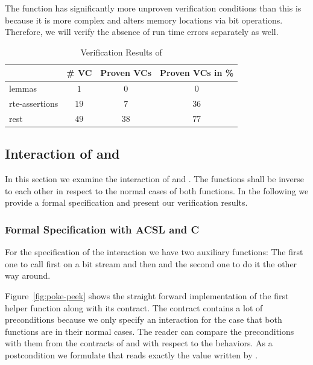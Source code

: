 The function \poke has significantly more unproven verification conditions than \peek
this is because it is more complex and alters memory locations via bit operations.
Therefore, we will verify the absence of run time errors separately as well.

\begin{table}
  \centering
  \begin{tabular}[h]{lccc}
    \toprule
     & \# VC & Proven VCs & Proven VCs in \%\\
    \midrule
    lemmas & $1$ &$0$ & $0$ \\
    rte-assertions&$19$&$7$&$36$\\
    rest &$49$ &$38$&$77$\\
    \bottomrule
  \end{tabular}
  \caption{Verification Results of \poke}
  \label{tab:results-poke}
\end{table}

\FloatBarrier


\subsection{Interaction of \peek and \poke}
\label{interaction}


In this section we examine the interaction of 
\peek and \poke. The functions shall be inverse to each other
in respect to the normal cases of both functions.
In the following we provide a formal specification and present
our verification results.


\subsubsection{Formal Specification with ACSL and C}

For the specification of the interaction we have two auxiliary \isoc functions:
The first one to call first \poke on a bit stream and then \peek
and the second one to do it the other way around.

Figure~\ref{fig:poke-peek} shows the straight forward implementation 
of the first helper function along with its \acsl contract.
The contract contains a lot of preconditions because we
only specify an interaction for the case that both functions are in their normal
cases. The reader can compare the preconditions with them from
the contracts of \peek and \poke with respect to the  behaviors.
As a postcondition we formulate that \peek reads exactly the value
written by \poke.

